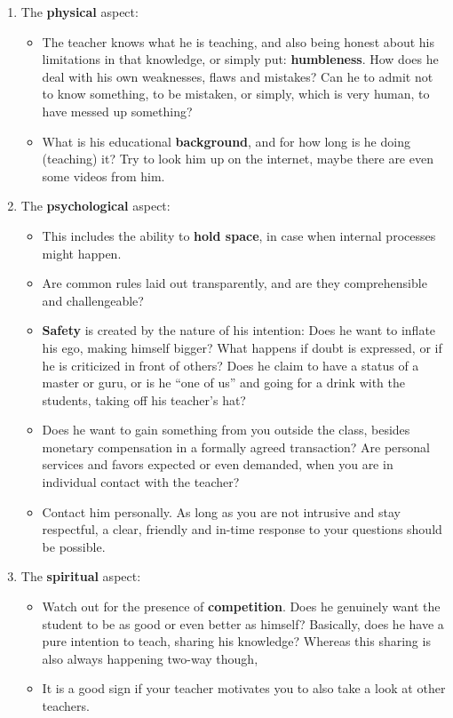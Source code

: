 \begin{enumerate}
    \item The \textbf{physical} aspect:
    \begin{itemize}
        \item The teacher knows what he is teaching, and also being honest about his limitations in that knowledge, or simply put: \textbf{humbleness}.
        How does he deal with his own weaknesses, flaws and mistakes?
        Can he to admit not to know something, to be mistaken, or simply, which is very human, to have messed up something?
        \item What is his educational \textbf{background}, and for how long is he doing (teaching) it?
        Try to look him up on the internet, maybe there are even some videos from him.
    \end{itemize}
    \item The \textbf{psychological} aspect:
    \begin{itemize}
        \item This includes the ability to \textbf{hold space}, in case when internal processes might happen.
        \item Are common rules laid out transparently, and are they comprehensible and challengeable?
        \item \textbf{Safety} is created by the nature of his intention: Does he want to inflate his ego, making himself bigger?
		What happens if doubt is expressed, or if he is criticized in front of others?
        Does he claim to have a status of a master or guru, or is he ``one of us'' and going for a drink with the students, taking off his teacher's hat?
        \item Does he want to gain something from you outside the class, besides monetary compensation in a formally agreed transaction?
        Are personal services and favors expected or even demanded, when you are in individual contact with the teacher?
        \item Contact him personally.
        As long as you are not intrusive and stay respectful, a clear, friendly and in-time response to your questions should be possible.
    \end{itemize}
    \item The \textbf{spiritual} aspect:
    \begin{itemize}
        \item Watch out for the presence of \textbf{competition}.
        Does he genuinely want the student to be as good or even better as himself?
        Basically, does he have a pure intention to teach, sharing his knowledge? Whereas this sharing is also always happening two-way though,
        \item It is a good sign if your teacher motivates you to also take a look at other teachers.
    \end{itemize}
\end{enumerate}

